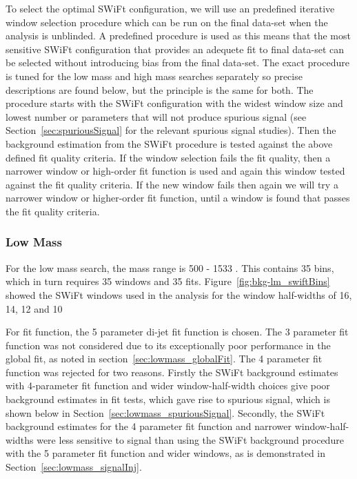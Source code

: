 To select the optimal SWiFt configuration, we will use an predefined iterative window selection procedure which can be run on the final data-set when the analysis is unblinded.
A predefined procedure is used as this means that the most sensitive SWiFt configuration that provides an adequete fit to final data-set can be selected
without introducing bias from the final data-set.
The exact procedure is tuned for the low mass and high mass searches separately so precise descriptions are found below,
but the principle is the same for both.
The procedure starts with the SWiFt configuration with the widest window size and lowest number or parameters that will not produce spurious signal
(see Section~\ref{sec:spuriousSignal} for the relevant spurious signal studies).
Then the background estimation from the SWiFt procedure is tested against the above defined fit quality criteria.
If the window selection fails the fit quality, then a narrower window or high-order fit function is used and again this window tested against the fit quality criteria.
If the new window fails then again we will try a narrower window or higher-order fit function, until a window is found that passes the fit quality criteria.


\subsubsection{Low Mass}
\label{sec:lowmass_windowSel}

For the low mass search, the mass range is 500 - 1533 \GeV. This contains 35 bins, which in turn requires 35 windows and 35 fits.
Figure~\ref{fig:bkg-lm_swiftBins} showed the SWiFt windows used in the \lm{} analysis for the window half-widths of 16, 14, 12 and 10

For fit function, the 5 parameter di-jet fit function is chosen.
The 3 parameter fit function was not considered due to its exceptionally poor performance in the global fit, as noted in section~\ref{sec:lowmass_globalFit}.
The 4 parameter fit function was rejected for two reasons.
Firstly the SWiFt background estimates with 4-parameter fit function and wider window-half-width choices give poor background estimates in fit tests, which gave rise to spurious signal,
which is shown below in Section~\ref{sec:lowmass_spuriousSignal}.
Secondly, the SWiFt background estimates for the 4 parameter fit function and narrower window-half-widths were less sensitive to signal than
using the SWiFt background procedure with the 5 parameter fit function and wider windows, as is demonstrated in Section~\ref{sec:lowmass_signalInj}.

